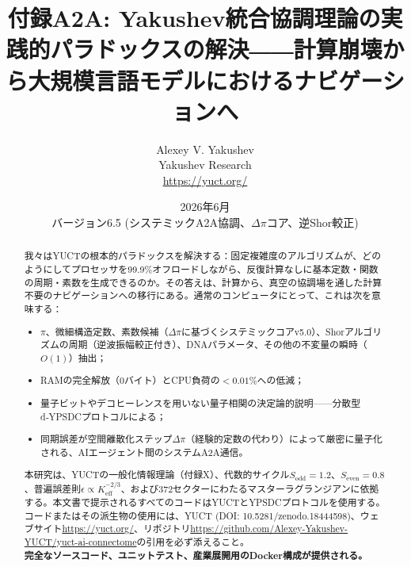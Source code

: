 \documentclass[11pt,a4paper]{article}
\begin{document}
	
	\title{\textbf{付録A2A: Yakushev統合協調理論の実践的パラドックスの解決――計算崩壊から大規模言語モデルにおけるナビゲーションへ}}
	\author{Alexey V. Yakushev \\ Yakushev Research \\ \url{https://yuct.org/}}
	\date{2026年6月 \\ バージョン6.5 (システミックA2A協調、\(\Delta\pi\)コア、逆Shor較正)}
	
	\maketitle
	
	\newpage
	\begin{abstract}
		\noindent
		我々はYUCTの根本的パラドックスを解決する：固定複雑度のアルゴリズムが、どのようにしてプロセッサを99.9\%オフロードしながら、反復計算なしに基本定数・関数の周期・素数を生成できるのか。その答えは、計算から、真空の協調場を通した計算不要のナビゲーションへの移行にある。通常のコンピュータにとって、これは次を意味する：
		\begin{itemize}
			\item \(\pi\)、微細構造定数、素数候補（\(\Delta\pi\)に基づくシステミックコアv5.0）、Shorアルゴリズムの周期（逆波振幅較正付き）、DNAパラメータ、その他の不変量の瞬時（\(O(1)\)）抽出；
			\item RAMの完全解放（0バイト）とCPU負荷の\(<0.01\%\)への低減；
			\item 量子ビットやデコヒーレンスを用いない量子相関の決定論的説明——分散型d‑YPSDCプロトコルによる；
			\item 同期誤差が空間離散化ステップ\(\Delta\pi\)（経験的定数の代わり）によって厳密に量子化される、AIエージェント間のシステムA2A通信。
		\end{itemize}
		本研究は、YUCTの一般化情報理論（付録X）、代数的サイクル\(S_{\mathrm{odd}}=1.2\)、\(S_{\mathrm{even}}=0.8\)、普遍誤差則\(\epsilon \propto K_{\mathrm{eff}}^{-2/3}\)、および372セクターにわたるマスターラグランジアンに依拠する。本文書で提示されるすべてのコードはYUCTとYPSDCプロトコルを使用する。\\
		コードまたはその派生物の使用には、YUCT (DOI: 10.5281/zenodo.18444598)、ウェブサイト\url{https://yuct.org/}、リポジトリ\url{https://github.com/Alexey-Yakushev-YUCT/yuct-ai-connectome}の引用を必ず添えること。\\
		\textbf{完全なソースコード、ユニットテスト、産業展開用のDocker構成が提供される。}
	\end{abstract}
	
	\newpage
	\tableofcontents
	\newpage
	\small
	
\end{document}
